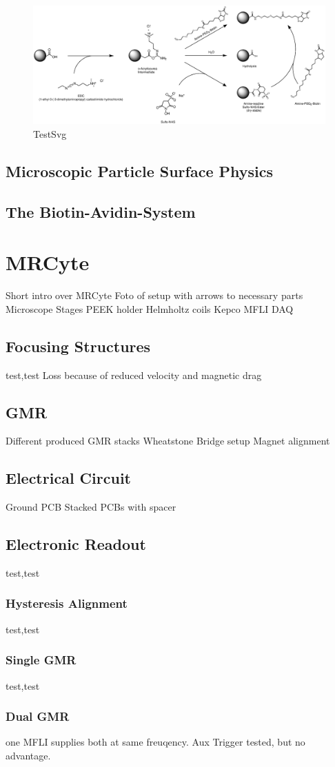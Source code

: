 \begin{figure}[hbtp]
\centering
\includegraphics[width=\textwidth]{./Ressources/Chemistry/EDC-NHS.eps}
\caption{TestSvg}
\label{fig:Chem:COOH-EDC-NHS}
\end{figure}
\subsection{Microscopic Particle Surface Physics}

\subsection{The Biotin-Avidin-System}


\section{MRCyte}
Short intro over MRCyte
Foto of setup with arrows to necessary parts
Microscope
Stages
PEEK holder
Helmholtz coils
Kepco
MFLI
DAQ
\subsection{Focusing Structures}
test,test
Loss because of reduced velocity and magnetic drag
\subsection{GMR}
Different produced GMR stacks
Wheatstone Bridge setup
Magnet alignment
\subsection{Electrical Circuit}
Ground
PCB
Stacked PCBs with spacer
\subsection{Electronic Readout}
test,test
\subsubsection{Hysteresis Alignment}
test,test
\subsubsection{Single GMR}
test,test
\subsubsection{Dual GMR}
one MFLI supplies both at same freuqency. Aux Trigger tested, but no advantage.


